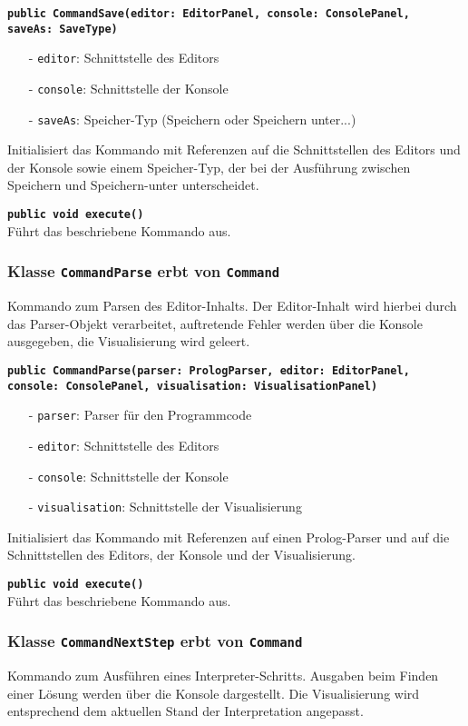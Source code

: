 \documentclass[parskip=full,11pt,twoside]{scrartcl}
\begin{document}
\textbf{\texttt{public CommandSave(editor: EditorPanel, console: ConsolePanel,\\saveAs: SaveType)}}\\
\begin{itemize}[noitemsep]
	\item[-] \texttt{editor}: Schnittstelle des Editors
	\item[-] \texttt{console}: Schnittstelle der Konsole
	\item[-] \texttt{saveAs}: Speicher-Typ (Speichern oder Speichern unter...)
\end{itemize}
Initialisiert das Kommando mit Referenzen auf die Schnittstellen des Editors und der Konsole sowie einem Speicher-Typ, der bei der Ausführung zwischen Speichern und Speichern-unter unterscheidet.

\textbf{\texttt{public void execute()}}\\
Führt das beschriebene Kommando aus.

\subsubsection{Klasse \texttt{CommandParse} erbt von \texttt{Command}}
Kommando zum Parsen des Editor-Inhalts. Der Editor-Inhalt wird hierbei durch das Parser-Objekt verarbeitet, auftretende Fehler werden über die Konsole ausgegeben, die Visualisierung wird geleert.

\textbf{\texttt{public CommandParse(parser: PrologParser, editor: EditorPanel,\\console: ConsolePanel, visualisation: VisualisationPanel)}}\\
\begin{itemize}[noitemsep]
	\item[-] \texttt{parser}: Parser für den Programmcode
	\item[-] \texttt{editor}: Schnittstelle des Editors
	\item[-] \texttt{console}: Schnittstelle der Konsole
	\item[-] \texttt{visualisation}: Schnittstelle der Visualisierung
\end{itemize}
Initialisiert das Kommando mit Referenzen auf einen Prolog-Parser und auf die Schnittstellen des Editors, der Konsole und der Visualisierung.

\textbf{\texttt{public void execute()}}\\
Führt das beschriebene Kommando aus.

\subsubsection{Klasse \texttt{CommandNextStep} erbt von \texttt{Command}}
Kommando zum Ausführen eines Interpreter-Schritts. Ausgaben beim Finden einer Lösung werden über die Konsole dargestellt. Die Visualisierung wird entsprechend dem aktuellen Stand der Interpretation angepasst.
\end{document}
